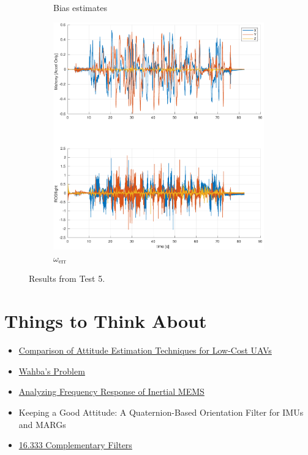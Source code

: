 \documentclass[a4paper]{article}
\begin{document}
\begin{figure}[H]
\begin{subfigure}[t]{0.31\textwidth}
    \caption{Bias estimates}
    \label{fig:scf_est}
  \end{subfigure}\hfill
  \begin{subfigure}[t]{0.31\textwidth}
    \includegraphics[width=\textwidth]{werr_accel_ext15.pdf}
    \caption{$\omega_\text{err}$}
    \label{fig:scf_bode}
  \end{subfigure}
  \caption{Results from Test 5.}
  \label{fig:scf}
\end{figure}

\section*{Things to Think About}
\begin{itemize}
  \item \href{https://arxiv.org/pdf/1602.07733.pdf}{Comparison of Attitude Estimation Techniques for Low-Cost UAVs}
  \item \href{https://en.wikipedia.org/wiki/Wahba%27s_problem}{Wahba's Problem}
  \item \href{https://www.analog.com/media/en/analog-dialogue/volume-46/number-3/articles/analyzing-frequency-response-of-inertial-mems.pdf}{Analyzing Frequency Response of Inertial MEMS}
  \item Keeping a Good Attitude: A Quaternion-Based Orientation Filter for IMUs and MARGs
  \item \href{https://ocw.mit.edu/courses/aeronautics-and-astronautics/16-333-aircraft-stability-and-control-fall-2004/lecture-notes/lecture_15.pdf}{16.333 Complementary Filters}
\end{itemize}



\end{document}
